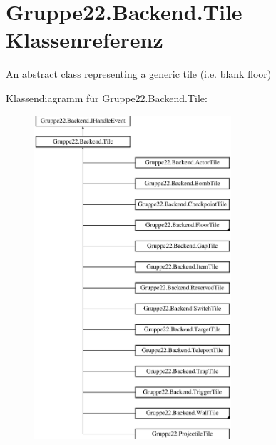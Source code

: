 \hypertarget{class_gruppe22_1_1_backend_1_1_tile}{\section{Gruppe22.\-Backend.\-Tile Klassenreferenz}
\label{class_gruppe22_1_1_backend_1_1_tile}
}


An abstract class representing a generic tile (i.\-e. blank floor)  


Klassendiagramm für Gruppe22.\-Backend.\-Tile\-:\begin{figure}[H]
\begin{center}
\leavevmode
\includegraphics[height=12.000000cm]{class_gruppe22_1_1_backend_1_1_tile}
\end{center}
\end{figure}
